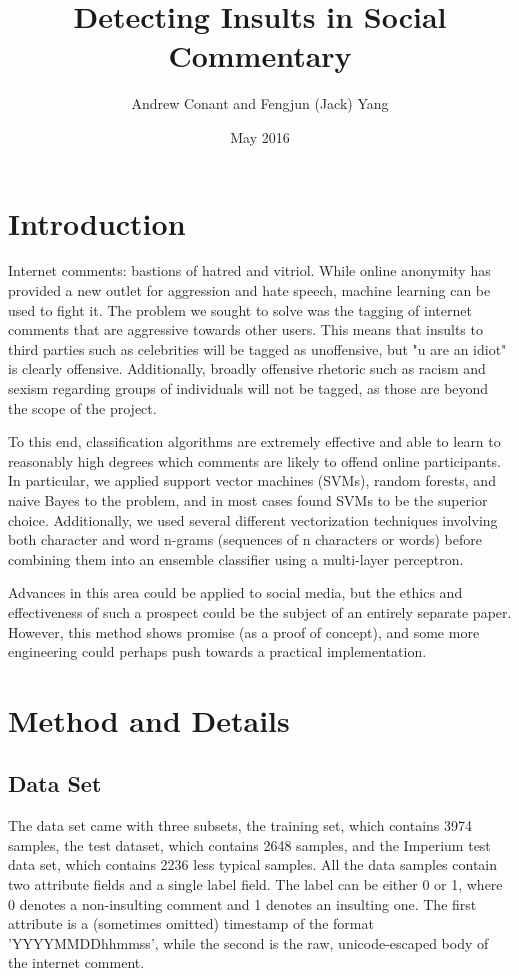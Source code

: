 \documentclass[11pt]{article}
\title{Detecting Insults in Social Commentary}
\author{Andrew Conant and Fengjun (Jack) Yang}
\date{May 2016}
\begin{document}
\maketitle
\section{Introduction}
Internet comments: bastions of hatred and vitriol. While online anonymity has
provided a new outlet for aggression and hate speech, machine learning can be
used to fight it. The problem we sought to solve was the tagging of internet
comments that are aggressive towards other users. This means that insults to
third parties such as celebrities will be tagged as unoffensive, but "u are an
idiot" is clearly offensive. Additionally, broadly offensive rhetoric such as
racism and sexism regarding groups of individuals will not be tagged, as those
are beyond the scope of the project. 

To this end, classification algorithms are extremely effective and able to
learn to reasonably high degrees which comments are likely to offend online
participants.  In particular, we applied support vector machines (SVMs), random
forests, and naive Bayes to the problem, and in most cases found SVMs to be the
superior choice.  Additionally, we used several different vectorization
techniques involving both character and word n-grams (sequences of n characters
or words) before combining them into an ensemble classifier using a multi-layer
perceptron.

Advances in this area could be applied to social media, but the ethics and
effectiveness of such a prospect could be the subject of an entirely separate
paper.  However, this method shows promise (as a proof of concept), and some
more engineering could perhaps push towards a practical implementation.

\section{Method and Details}

\subsection{Data Set}
The data set came with three subsets, the training set, which contains 3974
samples, the test dataset, which contains 2648 samples, and the Imperium test
data set, which contains 2236 less typical samples.  All the data samples
contain two attribute fields and a single label field. The label can be either
0 or 1, where 0 denotes a non-insulting comment and 1 denotes an insulting one.
The first attribute is a (sometimes omitted) timestamp of the format
'YYYYMMDDhhmmss', while the second is the raw, unicode-escaped body of the
internet comment.
\end{document}
